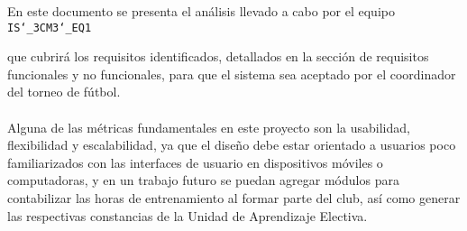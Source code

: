 En este documento se presenta el análisis llevado a cabo por el equipo \texttt{IS\char`_3CM3\char`_EQ1}

que cubrirá los requisitos identificados, detallados en la sección de requisitos funcionales y no funcionales, para que el sistema sea aceptado por el coordinador del torneo de fútbol.\\ \\

Alguna de las métricas fundamentales en este proyecto son la usabilidad, flexibilidad y escalabilidad, ya que el diseño debe estar orientado a usuarios poco familiarizados con las interfaces de usuario en dispositivos móviles o computadoras, y en un trabajo futuro se puedan agregar módulos para contabilizar las horas de entrenamiento al formar parte del club, así como generar las respectivas constancias de la Unidad de Aprendizaje Electiva.\\ \\
